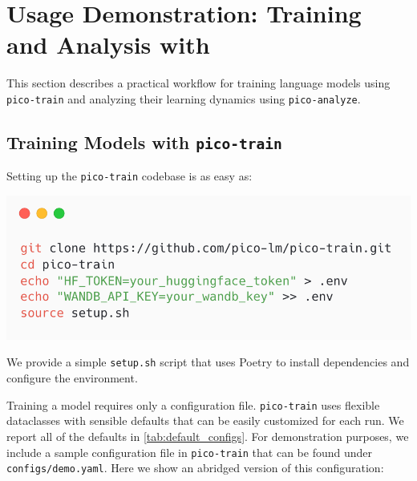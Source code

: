 \section{Usage Demonstration: Training and Analysis with \picolarge}

This section describes a practical workflow for training language models using \texttt{pico-train} and analyzing their learning dynamics using \texttt{pico-analyze}.

\subsection{Training Models with \texttt{pico-train}}

Setting up the \texttt{pico-train} codebase is as easy as:

\begin{center}
    \includegraphics[width=0.7\columnwidth]{chapters/pico/figures/demo/demo_setup.png}
\end{center}

We provide a simple \verb|setup.sh| script that uses Poetry \citep{poetry} to install dependencies and configure the environment.

Training a model requires only a configuration file. \texttt{pico-train} uses flexible dataclasses with sensible defaults that can be easily customized for each run. We report all of the defaults in \cref{tab:default_configs}. For demonstration purposes, we include a sample configuration file in \texttt{pico-train} that can be found under \verb|configs/demo.yaml|. Here we show an abridged version of this configuration:

